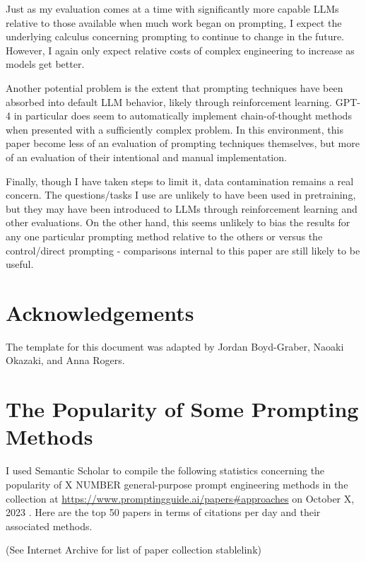 \documentclass[11pt]{article}
\begin{document}
Just as my evaluation comes at a time with significantly more capable LLMs relative to those available when much work began on prompting, I expect the underlying calculus concerning prompting to continue to change in the future. However, I again only expect relative costs of complex engineering to increase as models get better.

Another potential problem is the extent that prompting techniques have been absorbed into default LLM behavior, likely through reinforcement learning. GPT-4 in particular does seem to automatically implement chain-of-thought methods when presented with a sufficiently complex problem. In this environment, this paper become less of an evaluation of prompting techniques themselves, but more of an evaluation of their intentional and manual implementation.

Finally, though I have taken steps to limit it, data contamination remains a real concern. The questions/tasks I use are unlikely to have been used in pretraining, but they may have been introduced to LLMs through reinforcement learning and other evaluations. On the other hand, this seems unlikely to bias the results for any one particular prompting method relative to the others or versus the control/direct prompting - comparisons internal to this paper are still likely to be useful.

\section*{Acknowledgements}
The template for this document was adapted by Jordan Boyd-Graber, Naoaki Okazaki, and Anna Rogers.




\appendix

\section{The Popularity of Some Prompting Methods}

I used Semantic Scholar to compile the following statistics concerning the popularity of X NUMBER general-purpose prompt engineering methods in the collection at \url{https://www.promptingguide.ai/papers#approaches} on October X, 2023 \cite{noauthor_semantic_nodate}. Here are the top 50 papers in terms of citations per day and their associated methods.

(See Internet Archive for list of paper collection stablelink)
\end{document}
